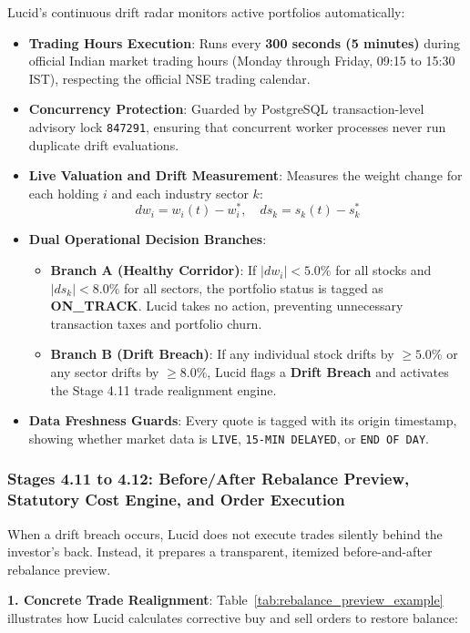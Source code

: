 Lucid's continuous drift radar monitors active portfolios automatically:
\begin{itemize}
    \item \textbf{Trading Hours Execution}: Runs every \textbf{300 seconds (5 minutes)} during official Indian market trading hours (Monday through Friday, 09:15 to 15:30 IST), respecting the official NSE trading calendar.
    \item \textbf{Concurrency Protection}: Guarded by PostgreSQL transaction-level advisory lock \texttt{847291}, ensuring that concurrent worker processes never run duplicate drift evaluations.
    \item \textbf{Live Valuation and Drift Measurement}: Measures the weight change for each holding $i$ and each industry sector $k$:
    \begin{equation}
    dw_i = w_i(t) - w_i^*, \quad ds_k = s_k(t) - s_k^*
    \end{equation}
    \item \textbf{Dual Operational Decision Branches}:
    \begin{itemize}
        \item \textbf{Branch A (Healthy Corridor)}: If $|dw_i| < 5.0\%$ for all stocks and $|ds_k| < 8.0\%$ for all sectors, the portfolio status is tagged as \textbf{ON\_TRACK}. Lucid takes no action, preventing unnecessary transaction taxes and portfolio churn.
        \item \textbf{Branch B (Drift Breach)}: If any individual stock drifts by $\ge 5.0\%$ or any sector drifts by $\ge 8.0\%$, Lucid flags a \textbf{Drift Breach} and activates the Stage 4.11 trade realignment engine.
    \end{itemize}
    \item \textbf{Data Freshness Guards}: Every quote is tagged with its origin timestamp, showing whether market data is \texttt{LIVE}, \texttt{15-MIN DELAYED}, or \texttt{END OF DAY}.
\end{itemize}

\subsubsection{Stages 4.11 to 4.12: Before/After Rebalance Preview, Statutory Cost Engine, and Order Execution}
When a drift breach occurs, Lucid does not execute trades silently behind the investor's back. Instead, it prepares a transparent, itemized before-and-after rebalance preview.

\noindent \textbf{1. Concrete Trade Realignment}:
Table~\ref{tab:rebalance_preview_example} illustrates how Lucid calculates corrective buy and sell orders to restore balance:

